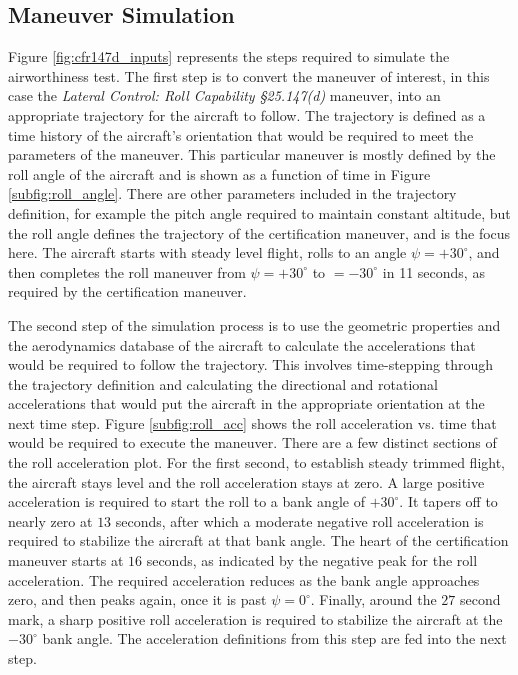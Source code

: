 \subsection{Maneuver Simulation}

Figure \ref{fig:cfr147d_inputs} represents the steps required to simulate the airworthiness test. 
The first step is to convert the maneuver of interest, in this case the \textit{Lateral Control: Roll Capability \S 25.147(d)} maneuver, into an appropriate trajectory for the aircraft to follow. 
The trajectory is defined as a time history of the aircraft's orientation that would be required to meet the parameters of the maneuver. 
This particular maneuver is mostly defined by the roll angle of the aircraft and is shown as a function of time in Figure \ref{subfig:roll_angle}.
There are other parameters included in the trajectory definition, for example the pitch angle required to maintain constant altitude, but the roll angle defines the trajectory of the certification maneuver, and is the focus here.
The aircraft starts with steady level flight, rolls to an angle $\psi = +30^\circ$, and then completes the roll maneuver from $\psi = +30^\circ$ to $=-30^\circ$ in 11 seconds, as required by the certification maneuver. 

The second step of the simulation process is to use the geometric properties and the aerodynamics database of the aircraft to calculate the accelerations that would be required to follow the trajectory.
This involves time-stepping through the trajectory definition and calculating the directional and rotational accelerations that would put the aircraft in the appropriate orientation at the next time step. 
Figure \ref{subfig:roll_acc} shows the roll acceleration vs. time that would be required to execute the maneuver.
There are a few distinct sections of the roll acceleration plot. 
For the first second, to establish steady trimmed flight, the aircraft stays level and the roll acceleration stays at zero.
A large positive acceleration is required to start the roll to a bank angle of $+30^\circ$. 
It tapers off to nearly zero at $13$ seconds, after which a moderate negative roll acceleration is required to stabilize the aircraft at that bank angle. 
The heart of the certification maneuver starts at $16$ seconds, as indicated by the negative peak for the roll acceleration.
The required acceleration reduces as the bank angle approaches zero, and then peaks again, once it is past $\psi=0^\circ$.
Finally, around the $27$ second mark, a sharp positive roll acceleration is required to stabilize the aircraft at the $-30^\circ$ bank angle. 
The acceleration definitions from this step are fed into the next step.

